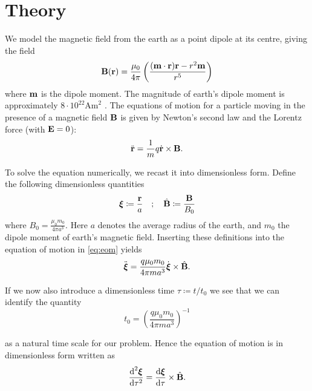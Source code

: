 \section{Theory}

We model the magnetic field from the earth as a point dipole at its centre, giving the field
\begin{equation}\label{eq:dipole}
	\mathbf{B}(\mathbf{r}) = \frac{\mu_0}{4 \pi} \left( \frac{(\mathbf{m} \cdot \mathbf{r}) \mathbf{r} - r^2 \mathbf{m}}{r^5} \right)
\end{equation}
where $\mathbf{m}$ is the dipole moment. The magnitude of earth's dipole moment is approximately $8\cdot10^{22} \mathrm{Am}^2$ \cite{Olson2006}. The equations of motion for a particle moving in the presence of a magnetic field $\mathbf{B}$ is given by Newton's second law and the Lorentz force (with $\mathbf{E} = 0$):
\begin{equation}\label{eq:eom}
	\ddot{\mathbf{r}} = \frac{1}{m} q \dot{\mathbf{r}} \times \mathbf{B}.
\end{equation}

To solve the equation numerically, we recast it into dimensionless form. Define the following dimensionless quantities 
\begin{equation}
	\boldsymbol{\xi} \coloneqq \frac{\mathbf{r}}{a} \quad ; \quad \hat{\mathbf{B}} \coloneqq \frac{\mathbf{B}}{B_0}
\end{equation}
where $B_0 = \frac{\mu_0 m_0}{4 \pi a^3}$. Here $a$ denotes the average radius of the earth, and $m_0$ the dipole moment of earth's magnetic field. Inserting these definitions into the equation of motion in \ref{eq:eom} yields
\begin{equation}
	\ddot{\boldsymbol{\xi}} = \frac{q \mu_0 m_0}{4\pi m a^3} \dot{\boldsymbol{\xi}} \times \hat{\mathbf{B}}.
\end{equation}

If we now also introduce a dimensionless time $\tau \coloneqq t/t_0$ we see that we can identify the quantity 
\begin{equation}
	t_0 = \left(\frac{q \mu_0 m_0 }{4 \pi m a^3} \right)^{-1}
\end{equation}

as a natural time scale for our problem. Hence the equation of motion is in dimensionless form written as 
\begin{equation}\label{eq:simpleeom}
	\frac{\text{d}^2 \boldsymbol{\xi}}{\text{d}\tau^2} = \frac{\text{d} \boldsymbol{\xi}}{\text{d} \tau} \times \hat{\mathbf{B}}.
\end{equation}

